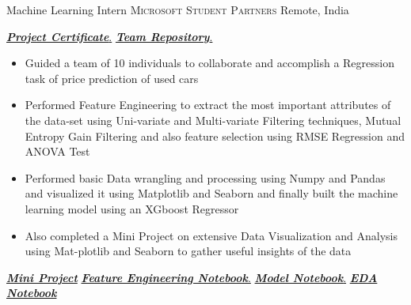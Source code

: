 \documentclass[11pt,a4paper,sans]{moderncv} %
\begin{document}
{Machine Learning Intern}
{\textsc{Microsoft Student Partners}}
{Remote, India}
{}
{
    \href{https://github.com/teetangh/Kaustav-All-Certifications/blob/master/Artificial\%20Intelligence/MSP\%20ML\%20Internship/internship\%20certificate.pdf}{ \textbf{\emph{Project Certificate}}.}
    \href{https://github.com/Microsoft-ML-Internship-Team/Major-Project-Submissions}{ \textbf{\emph{Team Repository}}.}
    \begin{itemize}
        \item {Guided a team of 10 individuals to collaborate and accomplish a Regression task of price prediction of used cars}
        \item {Performed Feature Engineering to extract the most important attributes of the data-set using Uni-variate and Multi-variate Filtering techniques, Mutual Entropy Gain Filtering and also feature selection using RMSE Regression and ANOVA Test}
        \item {Performed basic Data wrangling and processing using Numpy and Pandas and visualized it using Matplotlib and Seaborn and finally built the machine learning model using an XGboost Regressor}
        \item {Also completed a Mini Project on extensive Data Visualization and Analysis using Mat-plotlib and Seaborn to gather useful insights of the data}
    \end{itemize}
    \href{https://github.com/teetangh/Microsoft-Machine-Learning-Internship/blob/master/MINOR\%20PROJECT/Microsoft_Minor_Project_v2.ipynb}{\textbf{\emph{Mini Project}}}
    \href{https://github.com/Microsoft-ML-Internship-Team/Major-Project-Submissions/blob/master/KAUSTAV/02_Kaustav_feature_engineering_v4.ipynb}{\textbf{\emph{ Feature Engineering Notebook}}.}
    \href{https://github.com/Microsoft-ML-Internship-Team/Major-Project-Submissions/blob/master/KAUSTAV/03_Kaustav_Buidling_the_model_v1.ipynb}{\textbf{\emph{ Model Notebook}}.}
    \href{https://github.com/Microsoft-ML-Internship-Team/Major-Project-Submissions/blob/master/KAUSTAV/01_Kaustav_data_preprocess_EDA_v7.ipynb}{\textbf{\emph{ EDA Notebook}}}
}
\end{document}
